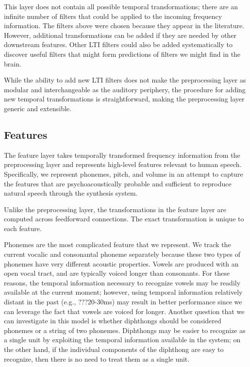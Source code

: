 This layer does not contain all possible
temporal transformations;
there are an infinite number of filters
that could be applied to the incoming
frequency information.
The filters above were chosen
because they appear in the literature.
However, additional transformations
can be added if they are needed
by other downstream features.
Other LTI filters could also be added
systematically to discover useful filters
that might form predictions of
filters we might find in the brain.

While the ability to add new LTI filters
does not make the preprocessing layer
as modular and interchangeable
as the auditory periphery,
the procedure for adding
new temporal transformations
is straightforward,
making the preprocessing layer
generic and extensible.

\subsection{Features}

The feature layer takes temporally transformed
frequency information from the preprocessing layer
and represents high-level features relevant
to human speech.
Specifically, we represent phonemes,
pitch, and volume in an attempt
to capture the features that are
psychoacoustically probable
and sufficient to reproduce
natural speech through the synthesis system.

Unlike the preprocessing layer,
the transformations in the feature layer
are computed across feedforward connections.
The exact transformation is unique to each feature.

Phonemes are the most complicated feature
that we represent.
We track
the current vocalic and consonantal phoneme separately
because these two types of phonemes
have very different acoustic properties.
Vowels are produced with an open vocal tract,
and are typically voiced longer than consonants.
For these reasons, the temporal information
necessary to recognize vowels
may be readily available at
the current moment;
however, using temporal information relatively
distant in the past (e.g., ???20-30ms)
may result in better performance since we can
leverage the fact that vowels are voiced for longer.
Another question that we can investigate in this model
is whether diphthongs should be considered phonemes
or a string of two phonemes.
Diphthongs may be easier to recognize as a single unit
by exploiting the temporal information available
in the system;
on the other hand, if the individual components
of the diphthong are easy to recognize,
then there is no need to treat them as a single unit.

